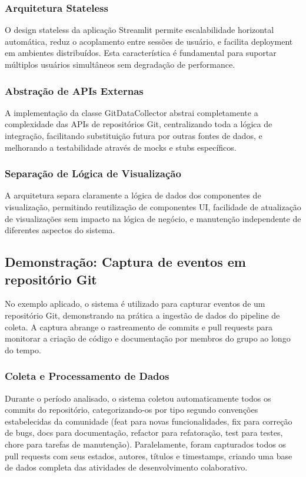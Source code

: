 \documentclass[12pt,a4paper]{article}
\begin{document}
\subsubsection{Arquitetura Stateless}

O design stateless da aplicação Streamlit permite escalabilidade horizontal automática, reduz o acoplamento entre sessões de usuário, e facilita deployment em ambientes distribuídos. Esta característica é fundamental para suportar múltiplos usuários simultâneos sem degradação de performance.

\subsubsection{Abstração de APIs Externas}

A implementação da classe GitDataCollector abstrai completamente a complexidade das APIs de repositórios Git, centralizando toda a lógica de integração, facilitando substituição futura por outras fontes de dados, e melhorando a testabilidade através de mocks e stubs específicos.

\subsubsection{Separação de Lógica de Visualização}

A arquitetura separa claramente a lógica de dados dos componentes de visualização, permitindo reutilização de componentes UI, facilidade de atualização de visualizações sem impacto na lógica de negócio, e manutenção independente de diferentes aspectos do sistema.

\subsection{Demonstração: Captura de eventos em repositório Git}

No exemplo aplicado, o sistema é utilizado para capturar eventos de um repositório Git, demonstrando na prática a ingestão de dados do pipeline de coleta. A captura abrange o rastreamento de commits e pull requests para monitorar a criação de código e documentação por membros do grupo ao longo do tempo.

\subsubsection{Coleta e Processamento de Dados}

Durante o período analisado, o sistema coletou automaticamente todos os commits do repositório, categorizando-os por tipo segundo convenções estabelecidas da comunidade (feat para novas funcionalidades, fix para correção de bugs, docs para documentação, refactor para refatoração, test para testes, chore para tarefas de manutenção). Paralelamente, foram capturados todos os pull requests com seus estados, autores, títulos e timestamps, criando uma base de dados completa das atividades de desenvolvimento colaborativo.
\end{document}
